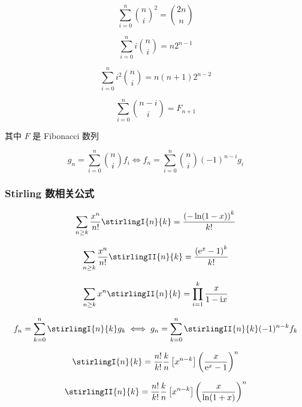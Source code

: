 \begin{equation}
    \sum_{i=0}^n\binom{n}{i}^2=\binom{2n}{n}
\end{equation}

\begin{equation}
    \sum_{i=0}^ni\binom{n}{i}=n2^{n-1}
\end{equation}

\begin{equation}
    \sum_{i=0}^ni^2\binom{n}{i}=n(n+1)2^{n-2}
\end{equation}

\begin{equation}
    \sum_{i=0}^n\binom{n-i}{i}=F_{n+1}
\end{equation}

其中 \(F\) 是 Fibonacci 数列

\begin{equation}
    g_n = \sum_{i = 0}^{n} \binom{n}{i} f_i \iff f_n = \sum_{i = 0}^{n} \binom{n}{i} (-1)^{n-i} g_i
\end{equation}

\subsubsection{Stirling 数相关公式}

\begin{equation}
    \sum_{n\geq k}\frac{x^n}{n!}\stirlingI{n}{k}=\frac{\left(-\ln(1-x)\right)^k}{k!}
\end{equation}

\begin{equation}
    \sum_{n\geq k}\frac{x^n}{n!}\stirlingII{n}{k}=\frac{\left(\mathrm{e}^x-1\right)^k}{k!}
\end{equation}

\begin{equation}
    \sum_{n\geq k}x^n\stirlingII{n}{k}=\prod_{i=1}^k\frac{x}{1-\mathrm{i}x}
\end{equation}

\begin{equation}
    f_n=\sum_{k=0}^n\stirlingI{n}{k}g_k \iff g_n=\sum_{k=0}^n\stirlingII{n}{k}(-1)^{n-k}f_k
\end{equation}

\begin{equation}
    \stirlingI{n}{k}=\frac{n!}{k!}\frac{k}{n}\left[x^{n-k}\right]\left(\frac{x}{\mathrm{e}^x-1}\right)^n
\end{equation}

\begin{equation}
    \stirlingII{n}{k}=\frac{n!}{k!}\frac{k}{n}\left[x^{n-k}\right]\left(\frac{x}{\ln(1+x)}\right)^n
\end{equation}

